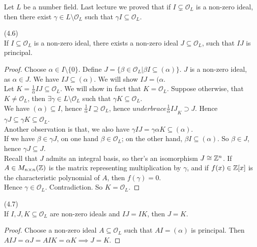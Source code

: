 \documentclass[a4paper]{article}
\begin{document}
Let $L$ be a number field. Last lecture we proved that if $I \subsetneq \mathcal{O}_L$ is a non-zero ideal, then there exist $\gamma \in L\setminus \mathcal{O}_L$ such that $\gamma I \subseteq \mathcal{O}_L$.

\begin{prop} (4.6)\\
If $I \subseteq \mathcal{O}_L$ is a non-zero ideal, there exists a non-zero ideal $J \subseteq \mathcal{O}_L$, such that $IJ$ is principal.
\begin{proof}
Choose $\alpha \in I \setminus \{0\}$. Define $J = \{\beta \in \mathcal{O}_L | \beta I \subseteq (\alpha)\}$. $J$ is a non-zero ideal, as $\alpha \in J$. We have $IJ \subseteq (\alpha)$. We will show $IJ = (\alpha$.\\
Let $K = \frac{1}{\alpha}IJ \subseteq \mathcal{O}_L$. We will show in fact that $K=\mathcal{O}_L$. Suppose otherwise, that $K \neq \mathcal{O}_L$, then $\exists \gamma \in L \setminus \mathcal{O}_L$ such that $\gamma K \subseteq \mathcal{O}_L$.\\
We have $(\alpha) \subseteq I$, hence $\frac{1}{\alpha} I \supseteq \mathcal{O}_L$, hence $underbrace{\frac{1}{\alpha} IJ}_{K} \supset J$. Hence $\gamma J \subseteq \gamma K \subseteq \mathcal{O}_L$.\\
Another observation is that, we also have $\gamma IJ = \gamma \alpha K \subseteq (\alpha)$.\\
If we have $\beta \in \gamma J$, on one hand $\beta \in \mathcal{O}_L$; on the other hand, $\beta I \subseteq (\alpha)$. So $\beta \in J$, hence $\gamma J \subseteq J$.\\
Recall that $J$ admits an integral basis, so ther's an isomorphism $J \cong \mathbb{Z}^n$. If $A \in M_{n \times n} (\mathbb{Z})$ is the matrix representing multiplication by $\gamma$, and if $f(x) \in \mathbb{Z}[x]$ is the characteristic polynomial of $A$, then $f(\gamma) = 0$.\\
Hence $\gamma \in \mathcal{O}_L$. Contradiction. So $K = \mathcal{O}_L$.
\end{proof}
\end{prop}

\begin{coro} (4.7)\\
If $I,J,K \subseteq \mathcal{O}_L$ are non-zero ideals and $IJ = IK$, then $J=K$.
\begin{proof}
Choose a non-zero ideal $A \subseteq \mathcal{O}_L$ such that $AI = (\alpha)$ is principal. Then $AIJ = \alpha J = AIK = \alpha K \implies J=K$.
\end{proof}
\end{coro}
\end{document}
